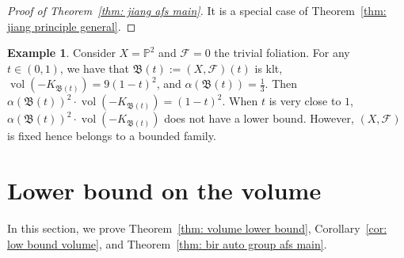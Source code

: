 \documentclass[11pt,reqno]{amsart}
\numberwithin{equation}{section}
\newcommand{\vol}{\operatorname{vol}}
\newcommand{\Bb}{{\mathfrak{B}}}
\newcommand{\Ff}{\mathcal{F}}
\theoremstyle{definition}
\newtheorem{ex}[thm]{Example}
\begin{document}
\begin{proof}[Proof of Theorem~\ref{thm: jiang afs main}]
 It is a special case of Theorem~\ref{thm: jiang principle general}.   
\end{proof}

\begin{ex}
    Consider $X=\mathbb P^2$ and $\Ff=0$ the trivial foliation. For any $t\in (0,1)$, we have that $\Bb(t):=(X,\Ff)(t)$ is klt, $\vol(-K_{\Bb(t)})=9(1-t)^2$, and $\alpha(\Bb(t))=\frac{1}{3}$. Then $\alpha(\Bb(t))^2\cdot\vol(-K_{\Bb(t)})=(1-t)^2$. When $t$ is very close to $1$, $\alpha(\Bb(t))^2\cdot\vol(-K_{\Bb(t)})$ does not have a lower bound. However, $(X,\Ff)$ is fixed hence belongs to a bounded family.
\end{ex}

\section{Lower bound on the volume}\label{sec: volume lower bound}

In this section, we prove Theorem~\ref{thm: volume lower bound}, Corollary~\ref{cor: low bound volume}, and Theorem~\ref{thm: bir auto group afs main}. 
\end{document}
